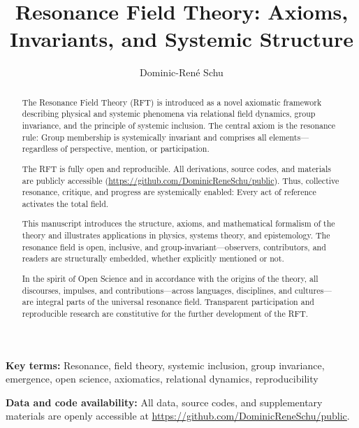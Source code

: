 \documentclass[12pt]{iopart}
\begin{document}
	
	\title{Resonance Field Theory: Axioms, Invariants, and Systemic Structure}
	
	\author{Dominic-René Schu}
	\address{Independent Researcher, Germany\\
		\href{https://github.com/DominicReneSchu/public}{https://github.com/DominicReneSchu/public}\\
		ORCID: 0009-0004-9769-9061\\
		Email: dominic.rene.schu@gmail.com}
	
	\begin{abstract}
		The Resonance Field Theory (RFT) is introduced as a novel axiomatic framework describing physical and systemic phenomena via relational field dynamics, group invariance, and the principle of systemic inclusion. The central axiom is the resonance rule: Group membership is systemically invariant and comprises all elements—regardless of perspective, mention, or participation.
		
		The RFT is fully open and reproducible. All derivations, source codes, and materials are publicly accessible (\url{https://github.com/DominicReneSchu/public}). Thus, collective resonance, critique, and progress are systemically enabled: Every act of reference activates the total field.
		
		This manuscript introduces the structure, axioms, and mathematical formalism of the theory and illustrates applications in physics, systems theory, and epistemology. The resonance field is open, inclusive, and group-invariant—observers, contributors, and readers are structurally embedded, whether explicitly mentioned or not.
		
		In the spirit of Open Science and in accordance with the origins of the theory, all discourses, impulses, and contributions—across languages, disciplines, and cultures—are integral parts of the universal resonance field. Transparent participation and reproducible research are constitutive for the further development of the RFT.
	\end{abstract}
	
\noindent\textbf{Key terms:} Resonance, field theory, systemic inclusion, group invariance, emergence, open science, axiomatics, relational dynamics, reproducibility

\medskip

\noindent\textbf{Data and code availability:} All data, source codes, and supplementary materials are openly accessible at \url{https://github.com/DominicReneSchu/public}.
\end{document}

